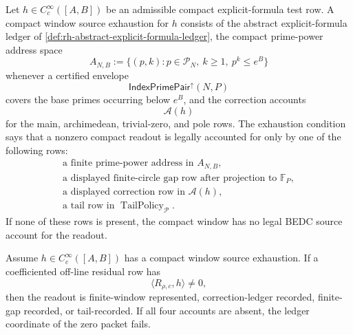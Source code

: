 \begin{definition}
\label{def:rh-compact-window-source-exhaustion}
Let $h\in C_c^\infty([A,B])$ be an admissible compact
explicit-formula test row.  A compact window source exhaustion for $h$
consists of the abstract explicit-formula ledger of
\autoref{def:rh-abstract-explicit-formula-ledger}, the compact
prime-power address space
$$
A_{N,B}:=\{(p,k):p\in\mathcal P_N,\ k\ge1,\ p^k\le e^B\}
$$
whenever a certified envelope
$$
\mathsf{IndexPrimePair}^{\uparrow}(N,P)
$$
covers the base primes occurring below $e^B$, and the correction
accounts
$$
\mathcal A(h)
$$
for the main, archimedean, trivial-zero, and pole rows.  The exhaustion
condition says that a nonzero compact readout is legally accounted for
only by one of the following rows:
$$
\begin{gathered}
\text{a finite prime-power address in }A_{N,B},\\
\text{a displayed finite-circle gap row after projection to }
\mathbb F_P,\\
\text{a displayed correction row in }\mathcal A(h),\\
\text{a tail row in }\operatorname{TailPolicy}_{\mathcal P}.
\end{gathered}
$$
If none of these rows is present, the compact window has no legal BEDC
source account for the readout.
\end{definition}

\begin{theorem}
\label{thm:rh-compact-window-exhaustion-no-addressless-residual}
Assume $h\in C_c^\infty([A,B])$ has a compact window source exhaustion.
If a coefficiented off-line residual row has
$$
\langle R_{\rho,c},h\rangle\ne0,
$$
then the readout is finite-window represented, correction-ledger
recorded, finite-gap recorded, or tail-recorded.  If all four accounts
are absent, the ledger coordinate of the zero packet fails.
\end{theorem}

